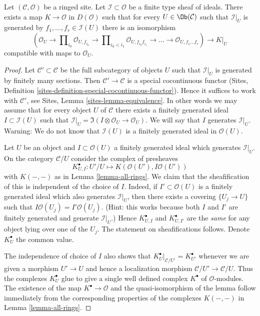 \begin{lemma}
\label{lemma-global-extended-cech-complex}
Let $(\mathcal{C}, \mathcal{O})$ be a ringed site. Let
$\mathcal{I} \subset \mathcal{O}$ be a finite type sheaf of ideals.
There exists a map $K \to \mathcal{O}$ in $D(\mathcal{O})$
such that for every $U \in \Ob(\mathcal{C})$ such that
$\mathcal{I}|_U$ is generated by $f_1, \ldots, f_r \in \mathcal{I}(U)$
there is an isomorphism
$$
(\mathcal{O}_U \to \prod\nolimits_{i_0} \mathcal{O}_{U, f_{i_0}} \to
\prod\nolimits_{i_0 < i_1} \mathcal{O}_{U, f_{i_0}f_{i_1}} \to
\ldots \to \mathcal{O}_{U, f_1\ldots f_r}) \longrightarrow K|_U
$$
compatible with maps to $\mathcal{O}_U$.
\end{lemma}

\begin{proof}
Let $\mathcal{C}' \subset \mathcal{C}$ be the full subcategory
of objects $U$ such that $\mathcal{I}|_U$ is generated by
finitely many sections. Then $\mathcal{C}' \to \mathcal{C}$
is a special cocontinuous functor
(Sites, Definition \ref{sites-definition-special-cocontinuous-functor}).
Hence it suffices to work with $\mathcal{C}'$, see
Sites, Lemma \ref{sites-lemma-equivalence}.
In other words we may assume that for every
object $U$ of $\mathcal{C}$ there exists a finitely generated
ideal $I \subset \mathcal{I}(U)$ such that
$\mathcal{I}|_U = \Im(I \otimes \mathcal{O}_U \to \mathcal{O}_U)$.
We will say that $I$ generates $\mathcal{I}|_U$.
Warning: We do not know that $\mathcal{I}(U)$ is a finitely generated
ideal in $\mathcal{O}(U)$.

\medskip\noindent
Let $U$ be an object and $I \subset \mathcal{O}(U)$ a finitely
generated ideal which generates $\mathcal{I}|_U$.
On the category $\mathcal{C}/U$ consider the complex of presheaves
$$
K_{U, I}^\bullet : U'/U \longmapsto K(\mathcal{O}(U'), I\mathcal{O}(U'))
$$
with $K(-, -)$ as in Lemma \ref{lemma-all-rings}.
We claim that the sheafification of this is independent of
the choice of $I$. Indeed, if $I' \subset \mathcal{O}(U)$
is a finitely generated ideal which also generates $\mathcal{I}|_U$, then
there exists a covering $\{U_j \to U\}$ such that
$I\mathcal{O}(U_j) = I'\mathcal{O}(U_j)$. (Hint: this works because
both $I$ and $I'$ are finitely generated and generate $\mathcal{I}|_U$.)
Hence $K_{U, I}^\bullet$ and $K_{U, I'}^\bullet$ are the {\it same}
for any object lying over one of the $U_j$. The statement
on sheafifications follows. Denote $K_U^\bullet$ the common value.

\medskip\noindent
The independence of choice of $I$ also shows that
$K_U^\bullet|_{\mathcal{C}/U'} = K_{U'}^\bullet$
whenever we are given a morphism
$U' \to U$ and hence a localization morphism
$\mathcal{C}/U' \to \mathcal{C}/U$. Thus the complexes
$K_U^\bullet$ glue to give a single well defined complex $K^\bullet$
of $\mathcal{O}$-modules. The existence of the map $K^\bullet \to \mathcal{O}$
and the quasi-isomorphism of the lemma follow immediately from
the corresponding properties of the complexes $K(-, -)$ in
Lemma \ref{lemma-all-rings}.
\end{proof}

